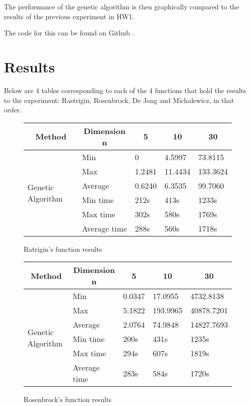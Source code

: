 \documentclass{article}
\begin{document}
The performance of the genetic algorithm is then graphically compared to the
results of the previous experiment in HW1.

The code for this can be found on Github \cite{github}.
\section{Results}
Below are 4 tables corresponding to each of the 4 functions that hold the 
results to the experiment: Rastrigin, Rosenbrock, De Jong and Michalewicz, 
in that order.

\vspace{5mm}

\begin{figure}[!h]
    \begin{tabular}{|l|l|l|l|l|}
        \hline
        \multicolumn{1}{|c|}{Method} & \multicolumn{1}{c|}{Dimension n} & \multicolumn{1}{c|}{5} & \multicolumn{1}{c|}{10} & \multicolumn{1}{c|}{30} \\ \hline
        \multirow{6}{*}{Genetic Algorithm} & Min & 0 & 4.5997 & 73.8115 \\ \cline{2-5} 
         & Max & 1.2481 & 11.4434 & 133.3624 \\ \cline{2-5} 
         & Average & 0.6240 & 6.3535 & 99.7060 \\ \cline{2-5} 
         & Min time & 212s & 413s & 1233s \\ \cline{2-5} 
         & Max time & 302s & 580s & 1769s \\ \cline{2-5} 
         & Average time & 288s & 560s & 1718s \\ \hline
    \end{tabular}
  \caption{Ratrigin's function results}
\end{figure}

\begin{figure}[!h]
    \begin{tabular}{|l|l|l|l|l|}
        \hline
        \multicolumn{1}{|c|}{Method} & \multicolumn{1}{c|}{Dimension n} & \multicolumn{1}{c|}{5} & \multicolumn{1}{c|}{10} & \multicolumn{1}{c|}{30} \\ \hline
        \multirow{6}{*}{Genetic Algorithm} & Min & 0.0347 & 17.0955 & 4732.8138 \\ \cline{2-5} 
         & Max & 5.1822 & 193.9965 & 40878.7201 \\ \cline{2-5} 
         & Average & 2.0764 & 74.9848 & 14827.7693 \\ \cline{2-5} 
         & Min time & 200s & 431s & 1235s \\ \cline{2-5} 
         & Max time & 294s & 607s & 1819s \\ \cline{2-5} 
         & Average time & 283s & 584s & 1720s \\ \hline
    \end{tabular}
  \caption{Rosenbrock's function results}
\end{figure}
\end{document}
